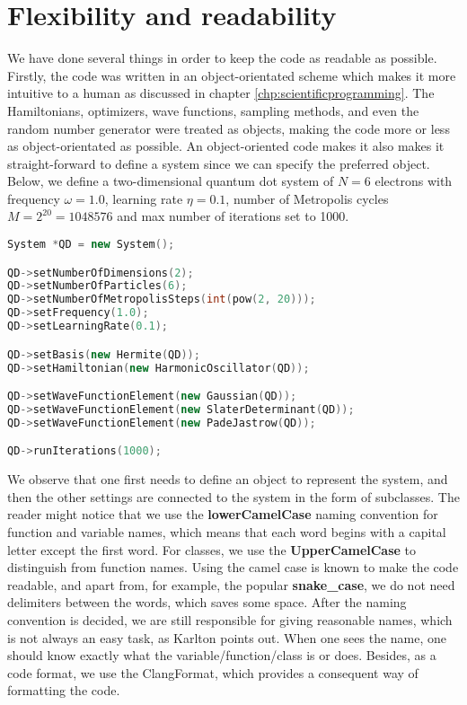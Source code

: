 \section{Flexibility and readability}
We have done several things in order to keep the code as readable as possible. Firstly, the code was written in an object-orientated scheme which makes it more intuitive to a human as discussed in chapter \ref{chp:scientificprogramming}. The Hamiltonians, optimizers, wave functions, sampling methods, and even the random number generator were treated as objects, making the code more or less as object-orientated as possible. An object-oriented code makes it also makes it straight-forward to define a system since we can specify the preferred object. Below, we define a two-dimensional quantum dot system of $N=6$ electrons with frequency $\omega=1.0$, learning rate $\eta=0.1$, number of Metropolis cycles $M=2^{20}=1048576$ and max number of iterations set to 1000.

\begin{lstlisting}[language={C++}, caption={Example on how a quantum dot system can be initialized.}, label={lst:qd}]
System *QD = new System();

QD->setNumberOfDimensions(2);
QD->setNumberOfParticles(6);
QD->setNumberOfMetropolisSteps(int(pow(2, 20)));
QD->setFrequency(1.0);
QD->setLearningRate(0.1);

QD->setBasis(new Hermite(QD));
QD->setHamiltonian(new HarmonicOscillator(QD));

QD->setWaveFunctionElement(new Gaussian(QD));
QD->setWaveFunctionElement(new SlaterDeterminant(QD));
QD->setWaveFunctionElement(new PadeJastrow(QD));

QD->runIterations(1000);
\end{lstlisting}
We observe that one first needs to define an object to represent the system, and then the other settings are connected to the system in the form of subclasses. The reader might notice that we use the \textbf{lowerCamelCase} naming convention for function and variable names, which means that each word begins with a capital letter except the first word. For classes, we use the \textbf{UpperCamelCase} to distinguish from function names. Using the camel case is known to make the code readable, and apart from, for example, the popular \textbf{snake\_case}, we do not need delimiters between the words, which saves some space. After the naming convention is decided, we are still responsible for giving reasonable names, which is not always an easy task, as Karlton points out. When one sees the name, one should know exactly what the variable/function/class is or does. Besides, as a code format, we use the ClangFormat, which provides a consequent way of formatting the code. 

